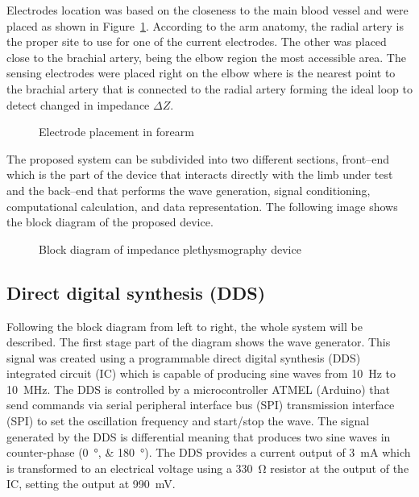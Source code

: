 
Electrodes location was based on the closeness to the main blood vessel and were placed as shown in Figure~\ref{fig:electrode}. According to the arm anatomy, the radial artery is the proper site to use for one of the current electrodes. The other was placed close to the brachial artery, being the elbow region the most accessible area. The sensing electrodes were placed right on the elbow where is the nearest point to the brachial artery that is connected to the radial artery forming the ideal loop to detect changed in impedance $\Delta Z$. 

\begin{figure}
    \caption{Electrode placement in forearm}
    \label{fig:electrode}
\end{figure}

The proposed system can be subdivided into two different sections, front–end which is the part of the device that interacts directly with the limb under test and the back–end that performs the wave generation, signal conditioning, computational calculation, and data representation. The following image shows the block diagram of the proposed device.

\begin{figure}
    \caption{Block diagram of impedance plethysmography device}
    \label{fig:block}
\end{figure}

\subsection{Direct digital synthesis (DDS)}
Following the block diagram from left to right, the whole system will be described. The first stage part of the diagram shows the wave generator. This signal was created using a programmable direct digital synthesis (DDS) integrated circuit (IC) which is capable of producing sine waves from \SI{10}{\hertz} to \SI{10}{\mega\hertz}. The DDS is controlled by a microcontroller ATMEL (Arduino) that send commands via serial peripheral interface bus (SPI) transmission interface (SPI) to set the oscillation frequency and start/stop the wave. The signal generated by the DDS is differential meaning that produces two sine waves in counter-phase (\SIlist{0;180}{\degree}). The DDS provides a current output of \SI{3}{\mA} which is transformed to an electrical voltage using a \SI{330}{\ohm} resistor at the output of the IC, setting the output at \SI{990}{\mV}. 

